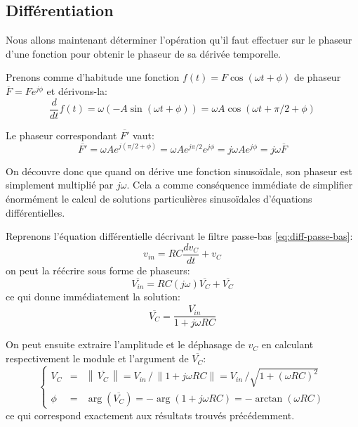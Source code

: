 \subsection{Différentiation}

Nous allons maintenant déterminer l'opération qu'il faut effectuer
sur le phaseur d'une fonction pour obtenir le phaseur de sa dérivée temporelle.

Prenons comme d'habitude une fonction $f(t) = F\cos(\omega t + \phi)$
de phaseur $\overline{F} = Fe^{j\phi}$
et dérivons-la:
\begin{equation}
    \frac{d}{dt}f(t) = \omega (-A\sin(\omega t + \phi))
    = \omega A \cos(\omega t + \pi/2 + \phi)
\end{equation}

Le phaseur correspondant $\overline{F'}$ vaut:
\begin{equation}
    \overline{F'} = \omega A e^{j(\pi/2 + \phi)} = \omega A e^{j\pi/2} e^{j\phi}
    = j\omega A e^{j\phi} = j\omega \overline{F}
\end{equation}

On découvre donc que quand on dérive une fonction sinusoïdale,
son phaseur est simplement multiplié par $j\omega$.
Cela a comme conséquence immédiate de simplifier énormément
le calcul de solutions particulières sinusoïdales d'équations différentielles.

Reprenons l'équation différentielle décrivant le filtre passe-bas
\eqref{eq:diff-passe-bas}:
\[
    v_{in} = RC\frac{dv_C}{dt} + v_C
\]
on peut la réécrire sous forme de phaseurs:
\begin{equation}
    \overline{V_{in}} = RC(j\omega)\overline{V_C} + \overline{V_C}
\end{equation}
ce qui donne immédiatement la solution:
\begin{equation}
    \overline{V_C} = \frac{\overline{V_{in}}}{1 + j\omega RC}
\end{equation}

On peut ensuite extraire l'amplitude et le déphasage de $v_C$
en calculant respectivement le module et l'argument de $\overline{V_C}$:
\begin{equation}
    \left\{
        \begin{array}{ccl}
            V_C &=& \left\|\,\overline{V_C}\,\right\|
            = V_{in}\,/\,\|1+j\omega RC\|
            = V_{in}\,/\sqrt{1 + (\omega RC)^2} \\
            \phi &=& \arg\left(\overline{V_C}\right) = -\arg(1+j\omega RC)
            = - \arctan(\omega RC)
        \end{array}
    \right.
\end{equation}
ce qui correspond exactement aux résultats trouvés précédemment.
